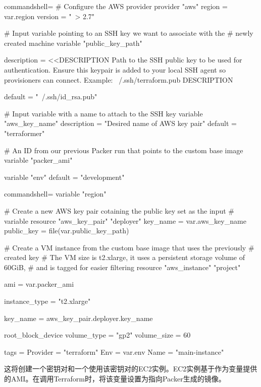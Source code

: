 \begin{tcblisting}{commandshell={}}
# Configure the AWS provider
provider "aws" {
  region = var.region
  version = "~> 2.7"
}

# Input variable pointing to an SSH key we want to associate with the
# newly created machine
variable "public_key_path" {
  description = <<DESCRIPTION
Path to the SSH public key to be used for authentication. 
Ensure this keypair is added to your local SSH agent so 
provisioners can connect.
Example: ~/.ssh/terraform.pub
DESCRIPTION

  default = "~/.ssh/id_rsa.pub"
}

# Input variable with a name to attach to the SSH key
variable "aws_key_name" {
  description = "Desired name of AWS key pair"
  default = "terraformer"
}

# An ID from our previous Packer run that points to the custom base image
variable "packer_ami" {
}

variable "env" {
  default = "development"
}
\end{tcblisting}
\begin{tcblisting}{commandshell={}}
variable "region" {
}

# Create a new AWS key pair cotaining the public key set as the input
# variable
resource "aws_key_pair" "deployer" {
  key_name = var.aws_key_name
  public_key = file(var.public_key_path)
}

# Create a VM instance from the custom base image that uses the previously 
# created key
# The VM size is t2.xlarge, it uses a persistent storage volume of 60GiB,
# and is tagged for easier filtering
resource "aws_instance" "project" {
  ami = var.packer_ami
  
  instance_type = "t2.xlarge"
  
  key_name = aws_key_pair.deployer.key_name
  
  root_block_device {
    volume_type = "gp2"
    volume_size = 60
  }

  tags = {
    Provider = "terraform"
    Env = var.env
    Name = "main-instance"
  }
}
\end{tcblisting}

这将创建一个密钥对和一个使用该密钥对的EC2实例。EC2实例基于作为变量提供的AMI。在调用Terraform时，将该变量设置为指向Packer生成的镜像。



